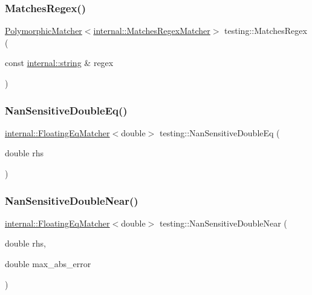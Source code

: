 \mbox{\label{namespacetesting_afea6e0eaf0ae69b409fc1c0285df6c8c}} 
\subsubsection{\texorpdfstring{Matches\+Regex()}{MatchesRegex()}\hspace{0.1cm}{\footnotesize\ttfamily [2/2]}}
{\footnotesize\ttfamily \hyperlink{classtesting_1_1_polymorphic_matcher}{Polymorphic\+Matcher}$<$\hyperlink{classtesting_1_1internal_1_1_matches_regex_matcher}{internal\+::\+Matches\+Regex\+Matcher}$>$ testing\+::\+Matches\+Regex (\begin{DoxyParamCaption}\item[{const \hyperlink{namespacetesting_1_1internal_a8e8ff5b11e64078831112677156cb111}{internal\+::string} \&}]{regex }\end{DoxyParamCaption})\hspace{0.3cm}{\ttfamily [inline]}}

\mbox{\label{namespacetesting_aa83ee35256fd90033f615ef640245525}} 
\subsubsection{\texorpdfstring{Nan\+Sensitive\+Double\+Eq()}{NanSensitiveDoubleEq()}}
{\footnotesize\ttfamily \hyperlink{classtesting_1_1internal_1_1_floating_eq_matcher}{internal\+::\+Floating\+Eq\+Matcher}$<$double$>$ testing\+::\+Nan\+Sensitive\+Double\+Eq (\begin{DoxyParamCaption}\item[{double}]{rhs }\end{DoxyParamCaption})\hspace{0.3cm}{\ttfamily [inline]}}

\mbox{\label{namespacetesting_a3caa8177ef48150d0dde3a54b0961f7f}} 
\subsubsection{\texorpdfstring{Nan\+Sensitive\+Double\+Near()}{NanSensitiveDoubleNear()}}
{\footnotesize\ttfamily \hyperlink{classtesting_1_1internal_1_1_floating_eq_matcher}{internal\+::\+Floating\+Eq\+Matcher}$<$double$>$ testing\+::\+Nan\+Sensitive\+Double\+Near (\begin{DoxyParamCaption}\item[{double}]{rhs,  }\item[{double}]{max\+\_\+abs\+\_\+error }\end{DoxyParamCaption})\hspace{0.3cm}{\ttfamily [inline]}}


